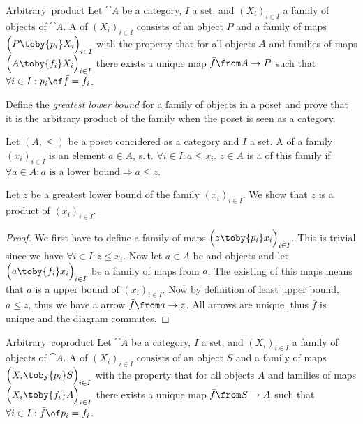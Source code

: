 
\begin{definition}{Arbitrary\ product}
  Let $\cat{A}$ be a category, $I$ a set, and $(X_i)_{i \in I}$ a family of objects of $\cat{A}$.
  A  of $(X_i)_{i \in I}$ consists of an object $P$ and a family of maps
  $\Bigl(P \toby{p_i} X_i\Bigr)_{i \in I}$
  with the property that for all objects $A$ and families of maps
  $\Bigl(A \toby{f_i} X_i\Bigr)_{i \in I}$
  there exists a unique map $\bar{f}\from A \to P$ such that
  $\forall i \in I: p_i \of \bar{f} = f_i$.
\end{definition}

\begin{exercise}
  Define the \emph{greatest lower bound} for a family of objects in a poset and prove that it is the arbitrary product of the family when the poset is seen as a category.
\end{exercise}

\begin{answer}
  Let $(A, \le)$ be a poset concidered as a category and $I$ a set.
  A  of a family $(x_i)_{i\in I}$ is an element $a \in A$, s.\,t. $\forall i \in I: a \le x_i$.
  $z \in A$ is a  of this family if $\forall a \in A: \text{$a$ is a lower bound} \Rightarrow a \le z$.

  Let $z$ be a greatest lower bound of the family $(x_i)_{i\in I}$. We show that $z$ is a product of $(x_i)_{i\in I}$.
  \begin{proof}
    We first have to define a family of maps $\Bigl(z \toby{p_i} x_i\Bigr)_{i \in I}$.
    This is trivial since we have $\forall i \in I: z \le x_i$.
    Now let $a \in A$ be and objects and let $\Bigl(a \toby{f_i} x_i\Bigr)_{i \in I}$ be a family of maps from $a$.
    The existing of this maps means that $a$ is a upper bound of $(x_i)_{i\in I}$.
    Now by definition of least upper bound, $a \le z$, thus we have a arrow $\bar{f} \from a \to z$.
    All arrows are unique, thus $\bar{f}$ is unique and the diagram commutes. \qedhere
  \end{proof}
\end{answer}

\begin{definition}{Arbitrary\ coproduct}
  Let $\cat{A}$ be a category, $I$ a set, and $(X_i)_{i \in I}$ a family of objects of $\cat{A}$.
  A  of $(X_i)_{i \in I}$ consists of an object $S$ and a family of maps
  $\Bigl(X_i \toby{p_i} S\Bigr)_{i \in I}$
  with the property that for all objects $A$ and families of maps
  $\Bigl(X_i \toby{f_i} A\Bigr)_{i \in I}$
  there exists a unique map $\bar{f}\from S \to A$ such that
  $\forall i \in I: \bar{f} \of p_i = f_i$.
\end{definition}

